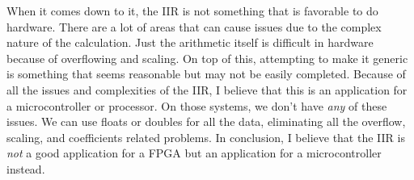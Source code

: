 \documentclass[12pt,a4paper,titlepage]{article}
\begin{document}
When it comes down to it, the IIR is not something that is favorable to do
hardware. There are a lot of areas that can cause issues due to the complex
nature of the calculation. Just the arithmetic itself is difficult in hardware
because of overflowing and scaling. On top of this, attempting to make it
generic is something that seems reasonable but may not be easily
completed. Because of all the issues and complexities of the IIR, I believe that
this is an application for a microcontroller or processor. On those systems, we
don't have \emph{any} of these issues. We can use floats or doubles for all the
data, eliminating all the overflow, scaling, and coefficients related
problems. In conclusion, I believe that the IIR is \emph{not} a good application
for a FPGA but an application for a microcontroller instead.

\newpage

\appendix
\end{document}
